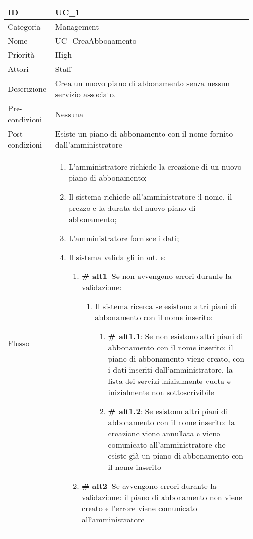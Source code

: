 \begin{center}

\begin{tabular}{ |p{2cm}|p{13cm}|  }
\hline
ID & UC\_1 \\\hline
Categoria & Management\\\hline
Nome & UC\_CreaAbbonamento\\\hline
Priorità & High \\\hline
Attori &  Staff \\\hline
Descrizione & Crea un nuovo piano di abbonamento senza nessun servizio associato.\\\hline
Pre-condizioni &  Nessuna\\\hline
Post-condizioni &  Esiste un piano di abbonamento con il nome fornito dall'amministratore\\\hline
Flusso &  	\begin{enumerate}
			\item L'amministratore richiede la creazione di un nuovo piano di abbonamento;
			\item Il sistema richiede all'amministratore il nome, il prezzo e la durata del nuovo piano di abbonamento;
			\item L'amministratore fornisce i dati;
			\item Il sistema valida gli input, e:
				\begin{enumerate}[  ]
				\item \textbf{\# alt1}: Se non avvengono errori durante la validazione:
					\begin{enumerate}[label*=\arabic*.]
					\item Il sistema ricerca se esistono altri piani di abbonamento con il nome inserito:
						\begin{enumerate}[label*=\arabic*.]
						\item \textbf{\# alt1.1}: Se non esistono altri piani di abbonamento con il nome inserito: il piano di abbonamento viene creato, con i dati inseriti dall'amministratore, la lista dei servizi inizialmente vuota e inizialmente non sottoscrivibile
						\item \textbf{\# alt1.2}: Se esistono altri piani di abbonamento con il nome inserito: la creazione viene annullata e viene comunicato all'amministratore che esiste già un piano di abbonamento con il nome inserito	
						\end{enumerate}
					\end{enumerate}
				\item \textbf{\# alt2}: Se avvengono errori durante la validazione: il piano di abbonamento non viene creato e l'errore viene comunicato all'amministratore
				\end{enumerate}
			

\end{enumerate}
\end{tabular}
\end{center}
